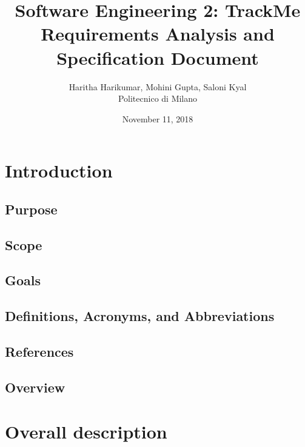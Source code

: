 \documentclass[12pt, a4paper]{report}
\begin{document}
\title{Software Engineering 2: TrackMe \\ \vspace{1em} Requirements Analysis and Specification Document}
\author{Haritha Harikumar, Mohini Gupta, Saloni Kyal\\
Politecnico di Milano}
\date{November 11, 2018}
\maketitle
\tableofcontents

\chapter{Introduction}
\label{ch:introduction}

\section{Purpose}


\section{Scope}


\section{Goals}


\section{Definitions, Acronyms, and Abbreviations}


\section{References}


\section{Overview}


\chapter{Overall description}
\label{ch:overall-desc}
\end{document}
